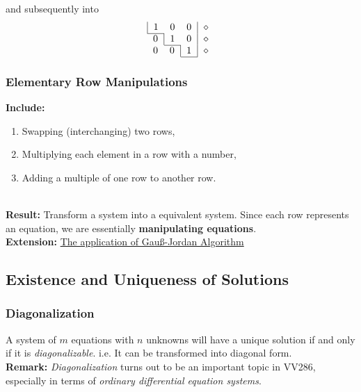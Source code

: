 \documentclass[12pt, t]{beamer}
\renewcommand{\emph}[1]{{\color{Turquoise3}\textsl{#1}}}
\newcommand{\nullspace}{~\\[15pt]}
\begin{document}
\begin{frame}
    and subsequently into \\
    \begin{equation}
        \begin{array}{c}
            \begin{tabular}{|ccc|c}
                1 & $0$ & $0$ & $\diamond$ \\ \cline{1-1}
            \end{tabular} \\
            \begin{tabular}{c|cc|c}
                0 & $1$ & $0$ & $\diamond$ \\ \cline{2-2}
            \end{tabular} \\
            \begin{tabular}{cc|c|c}
                0 & $0$ & $1$ & $\diamond$ \\
                \cline{3-3}
            \end{tabular}
        \end{array}
    \end{equation}
\end{frame}

\begin{frame}
    \frametitle{Elementary Row Manipulations}
    \textbf{Include:}
    \begin{enumerate}
        \item Swapping (interchanging) two rows,
        \item Multiplying each element in a row with a number,
        \item Adding a multiple of one row to another row.
    \end{enumerate}
    ~\\[15pt]

    \textbf{Result:} Transform a system into a equivalent system.
    Since each row represents an equation, we are essentially \textbf{manipulating equations}.\nullspace

    \textbf{Extension:}
    \href{https://en.wikipedia.org/wiki/Gaussian_elimination\#Applications}{The application of Gau\ss-Jordan Algorithm}
\end{frame}

\subsection{Existence and Uniqueness of Solutions}
\begin{frame}
    \frametitle{Diagonalization}
    A system of $m$ equations with $n$ unknowns will have a unique solution if and only if it is \emph{diagonalizable}. i.e. It can be transformed into diagonal form.\\[15pt]
    \textbf{Remark:} \emph{Diagonalization} turns out to be an important topic in VV286, especially in terms of \emph{ordinary differential equation systems}.
\end{frame}
\end{document}
